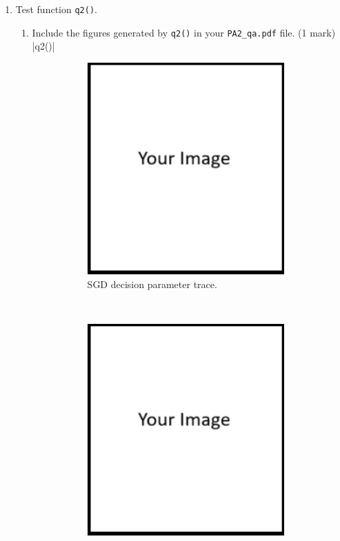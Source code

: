 \documentclass{article}
\theoremstyle{definition}
\newtheorem*{answer}{Answer}
\begin{document}
\begin{enumerate}[label=\ref{partsgd}.\alph*]
\begin{enumerate}[label=\ref{q11a}.\roman*]
		\item  With learning rate $\eta=0.05$, what would be the value of $w_1$, \textit{i.e.}, after one iteration of SGD update. Show your mathematical process. If you implemented SGD correctly, the figures generated by \verb|q1()| should verify your $w_1$. (1 mark)
		\begin{answer}
			Your answer ...
		\end{answer}
	\end{enumerate}
	\newpage
	\item \label{q11b}Test function \verb|q2()|.
	\begin{enumerate}[label=\ref{q11b}.\roman*]
		\item Include the figures generated by \verb|q2()| in your \verb|PA2_qa.pdf| file. (1 mark)
			|q2()|
			\begin{figure}[h]
				\centering
				\begin{subfigure}[t]{0.5\textwidth}
					\centering
					\includegraphics[height=3.2in]{image.png}
					\caption{SGD decision parameter trace.}
				\end{subfigure}%
				~ 
				\begin{subfigure}[t]{0.5\textwidth}
					\centering
					\includegraphics[height=3.2in]{image.png}

\end{subfigure}
\end{figure}
\end{enumerate}
\end{enumerate}
\end{document}
